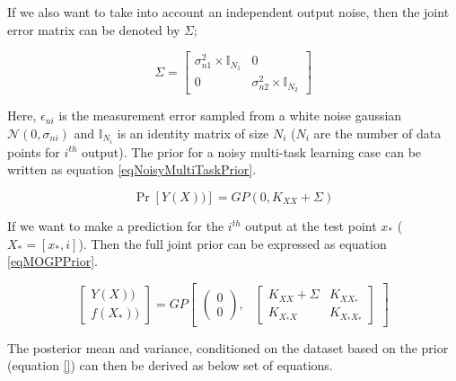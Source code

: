If we also want to take into account an independent output noise, then the joint error matrix can be denoted by \(\Sigma\);

\begin{equation}\label{eq:sigmaToError}
         \Sigma = 
          \begin{bmatrix}
          \sigma _{n1}^{2} \times \mathbb{I}_{N_{1}} & 0 \\ 
          0 & \sigma _{n2}^{2} \times \mathbb{I}_{N_{2}}
          \end{bmatrix} 
\end{equation}
         
Here, \(\epsilon_{ni}\) is the measurement error sampled from a white noise gaussian \(\mathcal{N}(0, \sigma_{ni})\) and \(\mathbb{I}_{N_{i}}\) is an identity matrix of size \(N_{i}\) (\(N_{i}\) are the number of data points for \(i^{th}\) output). The prior for a noisy multi-task learning case can be written as equation \ref{eqNoisyMultiTaskPrior}.

\begin{equation}\label{eqNoisyMultiTaskPrior}
         \Pr[Y(X))] = GP(0, K_{XX} + \Sigma)
\end{equation}
      
If we want to make a prediction for the $i^{th}$ output at the test point $x_{*}$ ($X_{*} = [x_{*}, i]$). Then the full joint prior can be expressed as equation \ref{eqMOGPPrior}.
 
 \begin{equation}\label{eqMOGPPrior}
 \begin{bmatrix}
   Y(X))\\ 
   f(X_{*}))
   \end{bmatrix} = GP\begin{bmatrix}
   \begin{pmatrix}
   0\\ 
   0
   \end{pmatrix}, 
   & 
   \begin{bmatrix}
   K_{XX} + \Sigma & K_{XX_{*}}\\ 
   K_{X_{*}X} & K_{X_{*}X_{*}}
   \end{bmatrix} 

   \end{bmatrix} 
 \end{equation}

  
The posterior mean and variance, conditioned on the dataset based on the prior (equation \ref{}) can then be derived as below set of equations.

